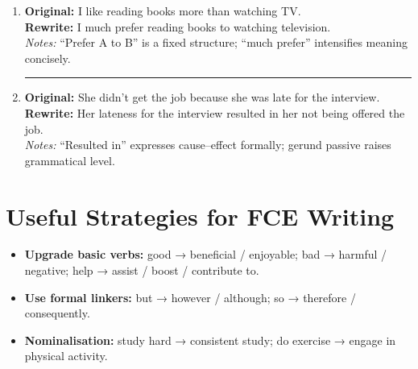\begin{enumerate}[leftmargin=2em, label=\arabic*.]
    \item \textbf{Original:} I like reading books more than watching TV. \\
    \textbf{Rewrite:} I much prefer reading books to watching television. \\
    \textit{Notes:} “Prefer A to B” is a fixed structure; “much prefer” intensifies meaning concisely.

    \vspace{2ex}
    \hrule
    \vspace{2ex}

    \item \textbf{Original:} She didn’t get the job because she was late for the interview. \\
    \textbf{Rewrite:} Her lateness for the interview resulted in her not being offered the job. \\
    \textit{Notes:} “Resulted in” expresses cause–effect formally; gerund passive raises grammatical level.

\end{enumerate}

\section{Useful Strategies for FCE Writing}

\begin{itemize}[leftmargin=2em]
    \item \textbf{Upgrade basic verbs:} good → beneficial / enjoyable; bad → harmful / negative; help → assist / boost / contribute to.
    \item \textbf{Use formal linkers:} but → however / although; so → therefore / consequently.
    \item \textbf{Nominalisation:} study hard → consistent study; do exercise → engage in physical activity.
\end{itemize}